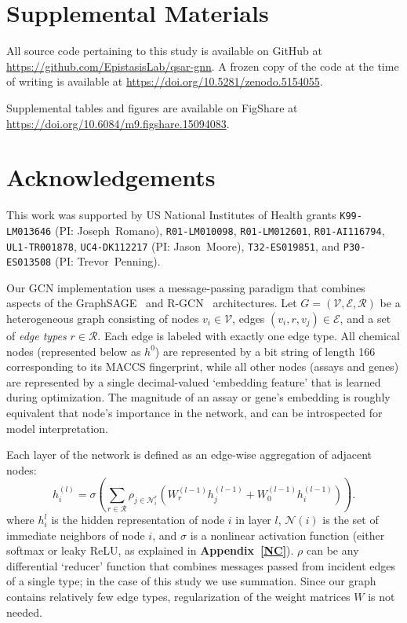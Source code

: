 \documentclass{ws-procs11x85}
\begin{document}
\section{Supplemental Materials}
All source code pertaining to this study is available on GitHub at \url{https://github.com/EpistasisLab/qsar-gnn}.
A frozen copy of the code at the time of writing is available at \url{https://doi.org/10.5281/zenodo.5154055}.

Supplemental tables and figures are available on FigShare at \url{https://doi.org/10.6084/m9.figshare.15094083}.

\section*{Acknowledgements}
This work was supported by US National Institutes of Health grants \texttt{K99-LM013646} (PI: Joseph~Romano), \texttt{R01-LM010098}, \texttt{R01-LM012601}, \texttt{R01-AI116794}, \texttt{UL1-TR001878}, \texttt{UC4-DK112217} (PI: Jason~Moore), \texttt{T32-ES019851}, and \texttt{P30-ES013508} (PI: Trevor~Penning).

\label{GCN}
Our GCN implementation uses a message-passing paradigm that combines aspects of the GraphSAGE~\cite{hamilton2017inductive} and R-GCN~\cite{schlichtkrull2018modeling} architectures.
Let $G = (\mathcal{V}, \mathcal{E}, \mathcal{R})$ be a heterogeneous graph consisting of nodes $v_i \in \mathcal{V}$, edges $(v_i, r, v_j)\in\mathcal{E}$, and a set of \textit{edge types} $r\in\mathcal{R}$.
Each edge is labeled with exactly one edge type.
All chemical nodes (represented below as $h^0$) are represented by a bit string of length 166 corresponding to its MACCS fingerprint, while all other nodes (assays and genes) are represented by a single decimal-valued `embedding feature' that is learned during optimization.
The magnitude of an assay or gene's embedding is roughly equivalent that node's importance in the network, and can be introspected for model interpretation.

Each layer of the network is defined as an edge-wise aggregation of adjacent nodes:
\begin{equation}
   h_i^{(l)} = \sigma \left(\sum_{r\in\mathcal{R}}\rho_{j\in\mathcal{N}_i^r}\left(W_r^{(l-1)} h_j^{(l-1)} + W_0^{(l-1)} h_i^{(l-1)}\right) \right).\label{eq:a1}
\end{equation}
where $h_i^l$ is the hidden representation of node $i$ in layer $l$, $\mathcal{N}(i)$ is the set of immediate neighbors of node $i$, and $\sigma$ is a nonlinear activation function (either softmax or leaky ReLU, as explained in \textbf{Appendix~\ref{NC}}).
$\rho$ can be any differential `reducer' function that combines messages passed from incident edges of a single type; in the case of this study we use summation.
Since our graph contains relatively few edge types, regularization of the weight matrices $W$ is not needed.
\end{document}
